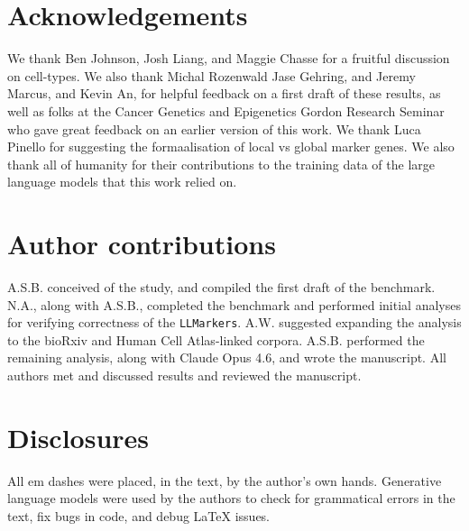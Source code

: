 \documentclass[10pt,twocolumn]{article}
\theoremstyle{plain}
\theoremstyle{definition}
\theoremstyle{remark}
\begin{document}
\section{Acknowledgements}
We thank Ben Johnson, Josh Liang, and Maggie Chasse for a fruitful discussion on cell-types. We also thank Michal Rozenwald Jase Gehring, and Jeremy Marcus, and Kevin An, for helpful feedback on a first draft of these results, as well as folks at the Cancer Genetics and Epigenetics Gordon Research Seminar who gave great feedback on an earlier version of this work. We thank Luca Pinello for suggesting the formaalisation of local vs global marker genes. We also thank all of humanity for their contributions to the training data of the large language models that this work relied on.

\section{Author contributions}
A.S.B. conceived of the study, and compiled the first draft of the benchmark. N.A., along with A.S.B., completed the benchmark and performed initial analyses for verifying correctness of the \texttt{LLMarkers}. A.W. suggested expanding the analysis to the bioRxiv and Human Cell Atlas-linked corpora. A.S.B. performed the remaining analysis, along with Claude Opus 4.6, and wrote the manuscript. All authors met and discussed results and reviewed the manuscript.

\section{Disclosures}
All em dashes were placed, in the text, by the author's own hands. Generative language models were used by the authors to check for grammatical errors in the text, fix bugs in code, and debug \LaTeX{} issues.

\newpage
\printclaimsources


\end{document}
